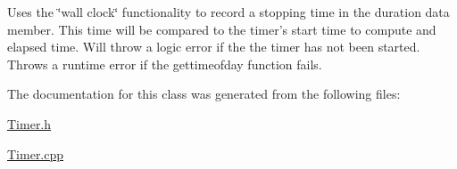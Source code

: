 \-Uses the \char`\"{}wall clock\char`\"{} functionality to record a stopping time in the duration data member. \-This time will be compared to the timer's start time to compute and elapsed time. \-Will throw a logic error if the the timer has not been started. \-Throws a runtime error if the gettimeofday function fails.


\begin{DoxyCode}
\end{DoxyCode}
 

\-The documentation for this class was generated from the following files\-:\begin{DoxyCompactItemize}
\item 
\hyperlink{_timer_8h}{\-Timer.\-h}\item 
\hyperlink{_timer_8cpp}{\-Timer.\-cpp}\end{DoxyCompactItemize}
